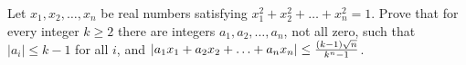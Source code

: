 Let $x_1,x_2,\ldots,x_n$ be real numbers satisfying $x_1^2+x_2^2+\ldots+x_n^2=1$. Prove that for every integer $k\ge2$ there are integers $a_1,a_2,\ldots,a_n$,  not all zero, such that $|a_i|\le k-1$ for all $i$,  and $|a_1x_1+a_2x_2+\ldots+a_nx_n|\le{(k-1)\sqrt n\over k^n-1}$.